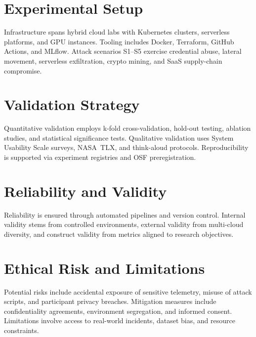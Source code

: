 \section{Experimental Setup}
Infrastructure spans hybrid cloud labs with Kubernetes clusters, serverless platforms, and GPU instances. Tooling includes Docker, Terraform, GitHub Actions, and MLflow. Attack scenarios S1--S5 exercise credential abuse, lateral movement, serverless exfiltration, crypto mining, and SaaS supply-chain compromise.

\section{Validation Strategy}
Quantitative validation employs k-fold cross-validation, hold-out testing, ablation studies, and statistical significance tests. Qualitative validation uses System Usability Scale surveys, NASA~TLX, and think-aloud protocols. Reproducibility is supported via experiment registries and OSF preregistration.

\section{Reliability and Validity}
Reliability is ensured through automated pipelines and version control. Internal validity stems from controlled environments, external validity from multi-cloud diversity, and construct validity from metrics aligned to research objectives.

\section{Ethical Risk and Limitations}
Potential risks include accidental exposure of sensitive telemetry, misuse of attack scripts, and participant privacy breaches. Mitigation measures include confidentiality agreements, environment segregation, and informed consent. Limitations involve access to real-world incidents, dataset bias, and resource constraints.
